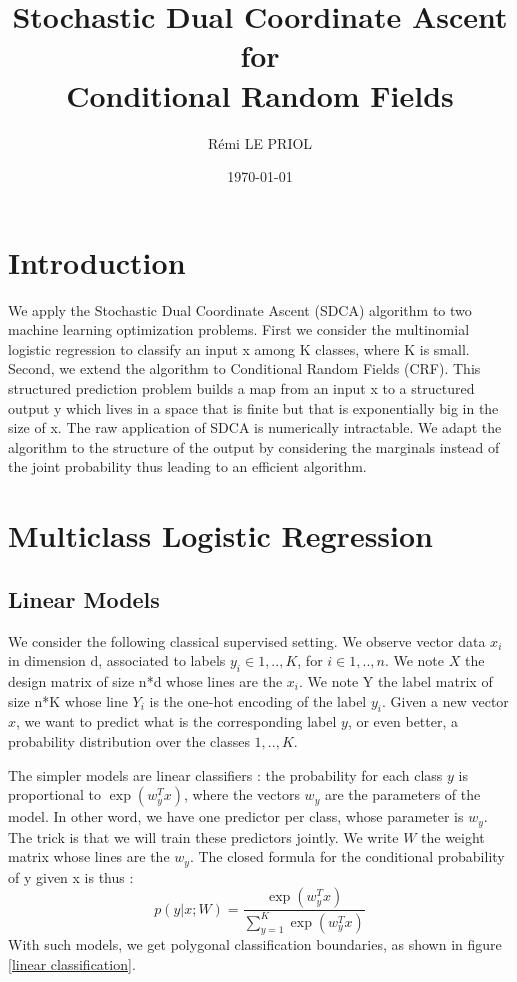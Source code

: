 \documentclass{article}
\title{Stochastic Dual Coordinate Ascent \\ for \\ Conditional Random Fields}
\author{R\'emi LE PRIOL}
\date{\today}
\begin{document}
\maketitle

\section*{Introduction}

We apply the Stochastic Dual Coordinate Ascent (SDCA) algorithm to two machine learning optimization problems. First we consider the multinomial logistic regression to classify an input x among K classes, where K is small. Second, we extend the algorithm to Conditional Random Fields (CRF). This structured prediction problem builds a map from an input x to a structured output y which lives in a space that is finite but that is exponentially big in the size of x. The raw application of SDCA is numerically intractable. We adapt the algorithm to the structure of the output by considering the marginals instead of the joint probability thus leading to an efficient algorithm.

\section{Multiclass Logistic Regression}

\subsection{Linear Models}

We consider the following classical supervised setting. We observe vector data $x_i$ in dimension d, associated to labels $y_i\in {1,..,K}$, for $i \in {1,..,n}$. We note $X$ the design matrix of size n*d whose lines are the $x_i$. We note Y the label matrix of size n*K whose line $Y_i$ is the one-hot encoding of the label $y_i$. Given a new vector $x$, we want to predict what is the corresponding label $y$, or even better, a probability distribution over the classes ${1,..,K}$. 

The simpler models are linear classifiers : the probability for each class $y$ is proportional to $\exp(w_y^Tx)$, where the vectors $w_y$ are the parameters of the model. In other word, we have one predictor per class, whose parameter is $w_y$. The trick is that we will train these predictors jointly. We write $W$ the weight matrix whose lines are the $w_y$. The closed formula for the conditional probability of y given x is thus :
\begin{equation}
	p(y|x;W) = \frac{\exp(w_y^Tx)}{\sum_{y=1}^K \exp(w_y^Tx)}
\end{equation}
With such models, we get polygonal classification boundaries, as shown in figure \ref{linear classification}.
\end{document}
